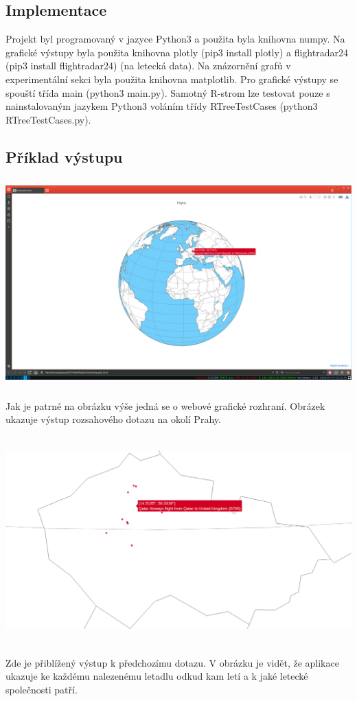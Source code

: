 \documentclass[12pt,a4paper]{article}
\begin{document}
\subsection*{Implementace}
Projekt byl programovaný v jazyce Python3 a použita byla knihovna numpy. Na grafické výstupy byla použita knihovna plotly (pip3 install plotly) a flightradar24 (pip3 install flightradar24) (na letecká data). Na znázornění grafů v experimentální sekci byla použita knihovna matplotlib. Pro grafické výstupy se spouští třída main (python3 main.py). Samotný R-strom lze testovat pouze s nainstalovaným jazykem Python3 voláním třídy RTreeTestCases (python3 RTreeTestCases.py).\par \bigskip

\subsection*{Příklad výstupu} \par \bigskip
\begin{center}
\includegraphics[width=15cm, height=8cm]{output1}
\end{center}
Jak je patrné na obrázku výše jedná se o webové grafické rozhraní. Obrázek ukazuje výstup rozsahového dotazu na okolí Prahy.

\begin{center}
\includegraphics[width=15cm, height=8cm]{output2}
\end{center}
Zde je přiblížený výstup k předchozímu dotazu. V obrázku je vidět, že aplikace ukazuje ke každému nalezenému letadlu odkud kam letí a k jaké letecké společnosti patří.
\end{document}

